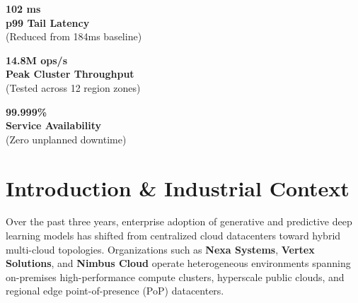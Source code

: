 \documentclass[10pt, a4paper]{article}
\begin{document}
\vspace{10pt}

\noindent
\begin{minipage}[t]{0.31\textwidth}
  \begin{tcolorbox}[calloutbox]
    \centering
    {\Large\bfseries\color{SummitBlue} 102 ms} \\[2pt]
    {\footnotesize\sffamily\color{SummitDark}\textbf{p99 Tail Latency}} \\[2pt]
    {\tiny\color{gray} (Reduced from 184ms baseline)}
  \end{tcolorbox}
\end{minipage}%
\hfill
\begin{minipage}[t]{0.31\textwidth}
  \begin{tcolorbox}[calloutbox]
    \centering
    {\Large\bfseries\color{SummitTeal} 14.8M ops/s} \\[2pt]
    {\footnotesize\sffamily\color{SummitDark}\textbf{Peak Cluster Throughput}} \\[2pt]
    {\tiny\color{gray} (Tested across 12 region zones)}
  \end{tcolorbox}
\end{minipage}%
\hfill
\begin{minipage}[t]{0.31\textwidth}
  \begin{tcolorbox}[calloutbox]
    \centering
    {\Large\bfseries\color{SummitAccent} 99.999\%} \\[2pt]
    {\footnotesize\sffamily\color{SummitDark}\textbf{Service Availability}} \\[2pt]
    {\tiny\color{gray} (Zero unplanned downtime)}
  \end{tcolorbox}
\end{minipage}

\vspace{15pt}

\section{Introduction \& Industrial Context}
Over the past three years, enterprise adoption of generative and predictive deep learning models has shifted from centralized cloud datacenters toward hybrid multi-cloud topologies. Organizations such as \textbf{Nexa Systems}, \textbf{Vertex Solutions}, and \textbf{Nimbus Cloud} operate heterogeneous environments spanning on-premises high-performance compute clusters, hyperscale public clouds, and regional edge point-of-presence (PoP) datacenters.
\end{document}
